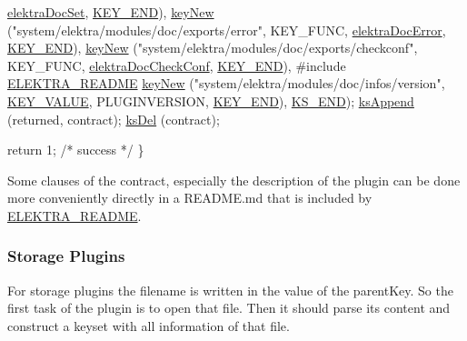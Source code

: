 \begin{DoxyCodeInclude}
      \hyperlink{group__plugin_gae65781a1deb34efc79c8cb9d9174842c}{elektraDocSet}, \hyperlink{group__key_gga91fb3178848bd682000958089abbaf40aa8adb6fcb92dec58fb19410eacfdd403}{KEY\_END}),
                               \hyperlink{group__key_gad23c65b44bf48d773759e1f9a4d43b89}{keyNew} (\textcolor{stringliteral}{"system/elektra/modules/doc/exports/error"}, KEY\_FUNC, 
      \hyperlink{group__plugin_gad74b35f558ac7c3262f6069c5c47dc79}{elektraDocError}, \hyperlink{group__key_gga91fb3178848bd682000958089abbaf40aa8adb6fcb92dec58fb19410eacfdd403}{KEY\_END}),
                               \hyperlink{group__key_gad23c65b44bf48d773759e1f9a4d43b89}{keyNew} (\textcolor{stringliteral}{"system/elektra/modules/doc/exports/checkconf"}, KEY\_FUNC, 
      \hyperlink{group__plugin_ga1c8702efe0f3853c2d7ecca0889f78e8}{elektraDocCheckConf}, \hyperlink{group__key_gga91fb3178848bd682000958089abbaf40aa8adb6fcb92dec58fb19410eacfdd403}{KEY\_END}),
#include \hyperlink{group__plugin_gabdcb97b05a83130c32bbde75db80fc50}{ELEKTRA\_README}
                               \hyperlink{group__key_gad23c65b44bf48d773759e1f9a4d43b89}{keyNew} (\textcolor{stringliteral}{"system/elektra/modules/doc/infos/version"}, 
      \hyperlink{group__key_gga91fb3178848bd682000958089abbaf40ac66e4a49d09212b79f5754ca6db5bd2e}{KEY\_VALUE}, PLUGINVERSION, \hyperlink{group__key_gga91fb3178848bd682000958089abbaf40aa8adb6fcb92dec58fb19410eacfdd403}{KEY\_END}), \hyperlink{kdbenum_8c_a7a28fce3773b2c873c94ac80b8b4cd54}{KS\_END});
                \hyperlink{group__keyset_ga21eb9c3a14a604ee3a8bdc779232e7b7}{ksAppend} (returned, contract);
                \hyperlink{group__keyset_ga27e5c16473b02a422238c8d970db7ac8}{ksDel} (contract);

                \textcolor{keywordflow}{return} 1; \textcolor{comment}{/* success */}
        \}
\end{DoxyCodeInclude}
 Some clauses of the contract, especially the description of the plugin can be done more conveniently directly in a R\+E\+A\+D\+M\+E.\+md that is included by \hyperlink{group__plugin_gabdcb97b05a83130c32bbde75db80fc50}{E\+L\+E\+K\+T\+R\+A\+\_\+\+R\+E\+A\+D\+ME}.\hypertarget{group__plugin_storage}{}\subsubsection{Storage Plugins}\label{group__plugin_storage}
For storage plugins the filename is written in the value of the parent\+Key. So the first task of the plugin is to open that file. Then it should parse its content and construct a keyset with all information of that file.

